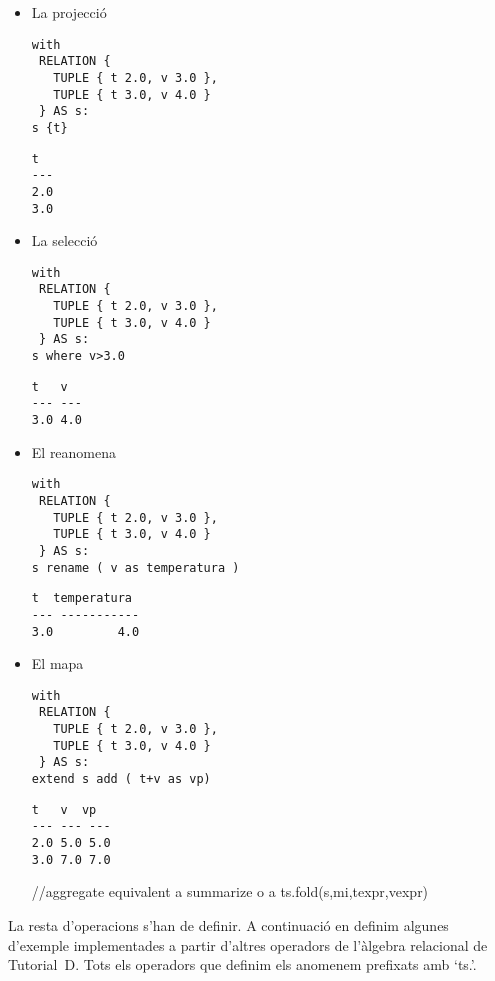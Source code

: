 \begin{itemize}
\item La projecció
\begin{lstlisting}[style=tutorialD]
with
 RELATION {
   TUPLE { t 2.0, v 3.0 },
   TUPLE { t 3.0, v 4.0 }
 } AS s:
s {t}
\end{lstlisting}
\begin{lstlisting}[style=stdout]
 t
---
2.0
3.0
\end{lstlisting}

\item La selecció
\begin{lstlisting}[style=tutorialD]
with
 RELATION {
   TUPLE { t 2.0, v 3.0 },
   TUPLE { t 3.0, v 4.0 }
 } AS s:
s where v>3.0
\end{lstlisting}
\begin{lstlisting}[style=stdout]
 t   v 
--- ---
3.0 4.0
\end{lstlisting}


\item El reanomena
\begin{lstlisting}[style=tutorialD]
with
 RELATION {
   TUPLE { t 2.0, v 3.0 },
   TUPLE { t 3.0, v 4.0 }
 } AS s:
s rename ( v as temperatura )
\end{lstlisting}
\begin{lstlisting}[style=stdout]
 t  temperatura 
--- -----------
3.0         4.0
\end{lstlisting}

\item El mapa 
\begin{lstlisting}[style=tutorialD]
with
 RELATION {
   TUPLE { t 2.0, v 3.0 },
   TUPLE { t 3.0, v 4.0 }
 } AS s:
extend s add ( t+v as vp) 
\end{lstlisting}
\begin{lstlisting}[style=stdout]
 t   v  vp
--- --- ---
2.0 5.0 5.0
3.0 7.0 7.0
\end{lstlisting}

\todo{}

//aggregate equivalent a summarize o a ts.fold(s,mi,texpr,vexpr)



\end{itemize}





La resta d'operacions s'han de definir. A continuació en definim
algunes d'exemple implementades a partir d'altres operadors de
l'àlgebra relacional de Tutorial~D. Tots els operadors que definim els
anomenem prefixats amb `ts.'.



